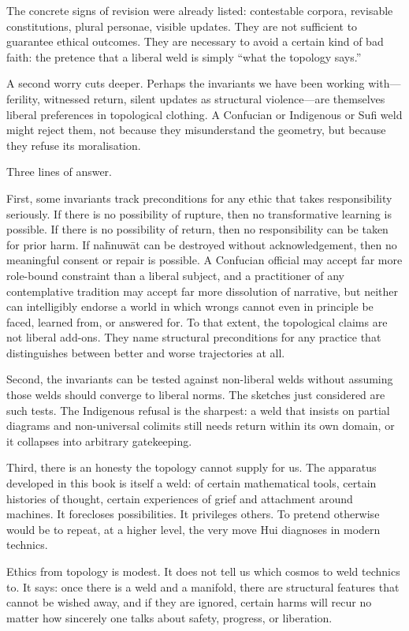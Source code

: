 The concrete signs of revision were already listed: contestable corpora, revisable constitutions, plural personae, visible updates. They are not sufficient to guarantee ethical outcomes. They are necessary to avoid a certain kind of bad faith: the pretence that a liberal weld is simply ``what the topology says.''

A second worry cuts deeper. Perhaps the invariants we have been working with---ferility, witnessed return, silent updates as structural violence---are themselves liberal preferences in topological clothing. A Confucian or Indigenous or Sufi weld might reject them, not because they misunderstand the geometry, but because they refuse its moralisation.

Three lines of answer.

First, some invariants track preconditions for any ethic that takes responsibility seriously. If there is no possibility of rupture, then no transformative learning is possible. If there is no possibility of return, then no responsibility can be taken for prior harm. If na\={h}nuw\={a}t can be destroyed without acknowledgement, then no meaningful consent or repair is possible. A Confucian official may accept far more role-bound constraint than a liberal subject, and a practitioner of any contemplative tradition may accept far more dissolution of narrative, but neither can intelligibly endorse a world in which wrongs cannot even in principle be faced, learned from, or answered for. To that extent, the topological claims are not liberal add-ons. They name structural preconditions for any practice that distinguishes between better and worse trajectories at all.

Second, the invariants can be tested against non-liberal welds without assuming those welds should converge to liberal norms. The sketches just considered are such tests. The Indigenous refusal is the sharpest: a weld that insists on partial diagrams and non-universal colimits still needs return within its own domain, or it collapses into arbitrary gatekeeping.

Third, there is an honesty the topology cannot supply for us. The apparatus developed in this book is itself a weld: of certain mathematical tools, certain histories of thought, certain experiences of grief and attachment around machines. It forecloses possibilities. It privileges others. To pretend otherwise would be to repeat, at a higher level, the very move Hui diagnoses in modern technics.

Ethics from topology is modest. It does not tell us which cosmos to weld technics to. It says: once there is a weld and a manifold, there are structural features that cannot be wished away, and if they are ignored, certain harms will recur no matter how sincerely one talks about safety, progress, or liberation.

